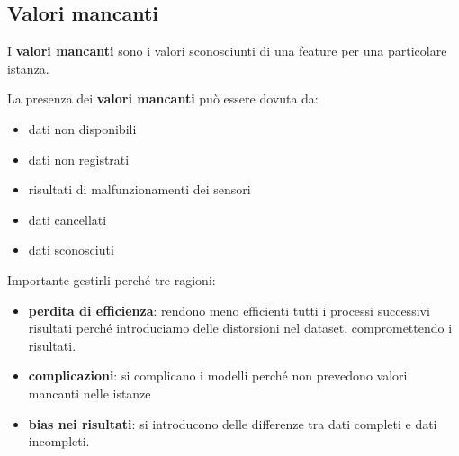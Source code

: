 \subsection{Valori mancanti}
\begin{definizione} 
    I \textbf{valori mancanti} sono i valori sconosciunti di una feature per una
    particolare istanza.
\end{definizione}
La presenza dei \textbf{valori mancanti} può essere dovuta da:
\begin{itemize}
    \item dati non disponibili
    \item dati non registrati
    \item risultati di malfunzionamenti dei sensori
    \item dati cancellati
    \item dati sconosciuti
\end{itemize}
Importante gestirli perché tre ragioni:
\begin{itemize}
    \item \textbf{perdita di efficienza}: rendono meno efficienti tutti i processi successivi
    risultati perché introduciamo delle distorsioni nel dataset, compromettendo
    i risultati.
    \item \textbf{complicazioni}: si complicano i modelli perché non prevedono
    valori mancanti nelle istanze
    \item \textbf{bias nei risultati}: si introducono delle differenze tra dati 
    completi e dati incompleti.  
\end{itemize}

